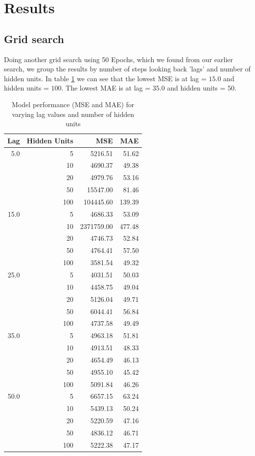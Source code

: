 \documentclass[conference]{IEEEtran}
\begin{document}
\section{Results}
\subsection{Grid search}
Doing another grid search using 50 Epochs, which we found from our earlier search, we group the results by
number of steps looking back 'lags' and number of hidden units. In table \ref{tab:lag_hidden_performance} we can see that
the lowest MSE is at lag = $15.0$ and hidden units = $100$. The lowest MAE is at lag = $35.0$ and hidden units = $50$.

\begin{table}[h!]
    \centering
    \begin{tabular}{r r r r}
    \hline
    \textbf{Lag} & \textbf{Hidden Units} & \textbf{MSE} & \textbf{MAE} \\
    \hline
    5.0  & 5   & 5216.51  & 51.62 \\
      & 10  & 4690.37  & 49.38 \\
      & 20  & 4979.76  & 53.16 \\
      & 50  & 15547.00 & 81.46 \\
      & 100 & 104445.60 & 139.39 \\
    \hline
    15.0  & 5   & 4686.33  & 53.09 \\
      & 10  & 2371759.00 & 477.48 \\
      & 20  & 4746.73  & 52.84 \\
      & 50  & 4764.41  & 57.50 \\
      & 100 & 3581.54  & 49.32 \\
    \hline
    25.0  & 5   & 4031.51  & 50.03 \\
      & 10  & 4458.75  & 49.04 \\
      & 20  & 5126.04  & 49.71 \\
      & 50  & 6044.41  & 56.84 \\
      & 100 & 4737.58  & 49.49 \\
    \hline
    35.0  & 5   & 4963.18  & 51.81 \\
      & 10  & 4913.51  & 48.33 \\
      & 20  & 4654.49  & 46.13 \\
      & 50  & 4955.10  & 45.42 \\
      & 100 & 5091.84  & 46.26 \\
    \hline
    50.0  & 5   & 6657.15  & 63.24 \\
      & 10  & 5439.13  & 50.24 \\
      & 20  & 5220.59  & 47.16 \\
      & 50  & 4836.12  & 46.71 \\
      & 100 & 5222.38  & 47.17 \\
    \hline
    \end{tabular}
    \caption{Model performance (MSE and MAE) for varying lag values and number of hidden units}
    \label{tab:lag_hidden_performance}
\end{table}
    
\end{document}
